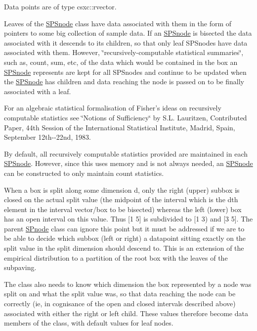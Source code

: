 \-Data points are of type csxc\-::rvector.

\-Leaves of the \hyperlink{classsubpavings_1_1SPSnode}{\-S\-P\-Snode} class have data associated with them in the form of pointers to some big collection of sample data. \-If an \hyperlink{classsubpavings_1_1SPSnode}{\-S\-P\-Snode} is bisected the data associated with it descends to its children, so that only leaf \-S\-P\-Snodes have data associated with them. \-However, \char`\"{}recursively-\/computable statistical summaries\char`\"{}, such as, count, sum, etc, of the data which would be contained in the box an \hyperlink{classsubpavings_1_1SPSnode}{\-S\-P\-Snode} represents are kept for all \-S\-P\-Snodes and continue to be updated when the \hyperlink{classsubpavings_1_1SPSnode}{\-S\-P\-Snode} has children and data reaching the node is passed on to be finally associated with a leaf.

\-For an algebraic statistical formalisation of \-Fisher's ideas on recursively computable statistics see \char`\"{}\-Notions of Sufficiency\char`\"{} by \-S.\-L. \-Lauritzen, \-Contributed \-Paper, 44th \-Session of the \-International \-Statistical \-Institute, \-Madrid, \-Spain, \-September 12th-\/-\/22nd, 1983.

\-By default, all recursively computable statistics provided are maintained in each \hyperlink{classsubpavings_1_1SPSnode}{\-S\-P\-Snode}. \-However, since this uses memory and is not always needed, an \hyperlink{classsubpavings_1_1SPSnode}{\-S\-P\-Snode} can be constructed to only maintain count statistics.

\-When a box is split along some dimension d, only the right (upper) subbox is closed on the actual split value (the midpoint of the interval which is the dth element in the interval vector/box to be bisected) whereas the left (lower) box has an open interval on this value. \-Thus \mbox{[}1 5\mbox{]} is subdivided to \mbox{[}1 3) and \mbox{[}3 5\mbox{]}. \-The parent \hyperlink{classsubpavings_1_1SPnode}{\-S\-Pnode} class can ignore this point but it must be addressed if we are to be able to decide which subbox (left or right) a datapoint sitting exactly on the split value in the split dimension should descend to. \-This is an extension of the empirical distribution to a partition of the root box with the leaves of the subpaving.

\-The class also needs to know which dimension the box represented by a node was split on and what the split value was, so that data reaching the node can be correctly (ie, in cognisance of the open and closed intervals described above) associated with either the right or left child. \-These values therefore become data members of the class, with default values for leaf nodes. 


